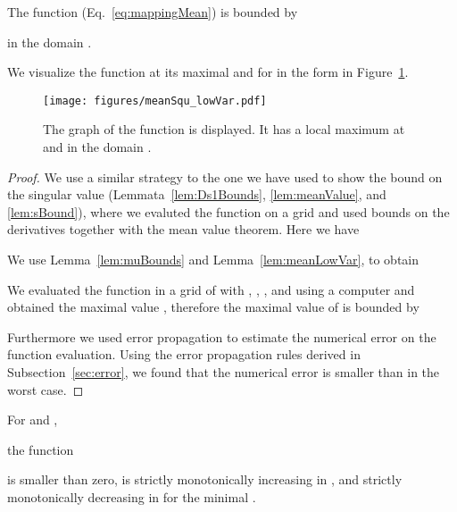 \documentclass{article}
\begin{document}
\begin{lemma}
\label{lem:musquared}
The function  
(Eq.~\eqref{eq:mappingMean})
is bounded by


in the domain 
.
\end{lemma}

We visualize the function  at its maximal  and for  in the form
  in Figure~\ref{fig:meanSqu}.

\begin{figure}
 \centering
 \texttt{[image: figures/meanSqu\_lowVar.pdf]}
 \caption[Graph of the function ]{The graph of the function  is displayed. It has a local 
  maximum at  and  in the domain . \label{fig:meanSqu}}
\end{figure}



\begin{proof}
We use a similar strategy to the one we have used to show the bound on the singular value (Lemmata~\ref{lem:Ds1Bounds}, \ref{lem:meanValue}, and \ref{lem:sBound}), where
we evaluted the function on a grid and used bounds on the derivatives together with the mean value theorem.
Here we have


We use Lemma~\ref{lem:muBounds} and Lemma~\ref{lem:meanLowVar}, to obtain 


We evaluated the function  in a grid  of  with ,
,
, and
 using a computer and obtained the maximal value , therefore 
the maximal value of    is bounded by



Furthermore we used error propagation to estimate the numerical error on the function evaluation. Using the error propagation rules 
derived in Subsection~\ref{sec:error}, we found that the numerical error is smaller than  in the worst case.
\end{proof}







\begin{lemma}
\label{proof:mainsubfunction}
For  and , 

the function

is smaller than zero, is strictly monotonically increasing in ,
and strictly monotonically decreasing in  for the minimal .
\end{lemma}
\end{document}
